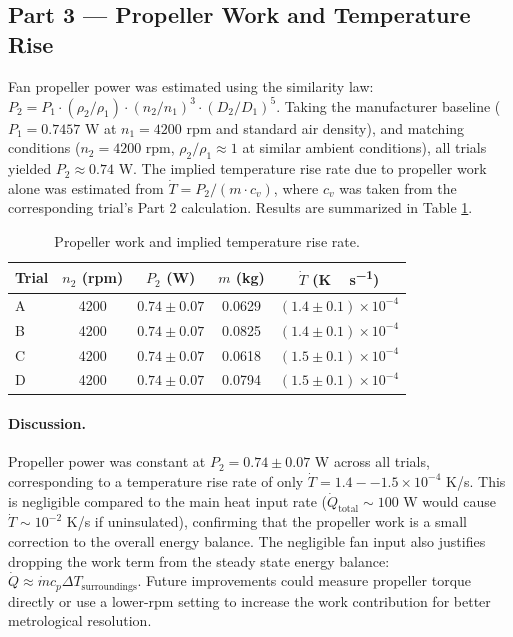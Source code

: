 \documentclass[12pt]{article}
\begin{document}
\subsection*{Part 3 — Propeller Work and Temperature Rise}

Fan propeller power was estimated using the similarity law: $P_2 = P_1 \cdot (\rho_2/\rho_1) \cdot (n_2/n_1)^3 \cdot (D_2/D_1)^5$. Taking the manufacturer baseline ($P_1 = 0.7457$ W at $n_1 = 4200$ rpm and standard air density), and matching conditions ($n_2 = 4200$ rpm, $\rho_2/\rho_1 \approx 1$ at similar ambient conditions), all trials yielded $P_2 \approx 0.74$ W. The implied temperature rise rate due to propeller work alone was estimated from $\dot{T} = P_2 / (m \cdot c_v)$, where $c_v$ was taken from the corresponding trial's Part 2 calculation. Results are summarized in Table \ref{tab:prop}.

\begin{table}[H]\centering
\begin{tabular}{@{}lcccc@{}}
\toprule
Trial & $n_2$ (rpm) & $P_2$ (W) & $m$ (kg) & $\dot T$ (\si{K\,s^{-1}}) \\
\midrule
A & 4200 & $0.74 \pm 0.07$ & 0.0629 & $(1.4 \pm 0.1) \times 10^{-4}$ \\
B & 4200 & $0.74 \pm 0.07$ & 0.0825 & $(1.4 \pm 0.1) \times 10^{-4}$ \\
C & 4200 & $0.74 \pm 0.07$ & 0.0618 & $(1.5 \pm 0.1) \times 10^{-4}$ \\
D & 4200 & $0.74 \pm 0.07$ & 0.0794 & $(1.5 \pm 0.1) \times 10^{-4}$ \\
\bottomrule
\end{tabular}
\caption{Propeller work and implied temperature rise rate.}
\label{tab:prop}
\end{table}

\paragraph{Discussion.} Propeller power was constant at $P_2 = 0.74 \pm 0.07$ W across all trials, corresponding to a temperature rise rate of only $\dot{T} = 1.4--1.5 \times 10^{-4}$ K/s. This is negligible compared to the main heat input rate ($\dot{Q}_{\text{total}} \sim 100$ W would cause $\dot{T} \sim 10^{-2}$ K/s if uninsulated), confirming that the propeller work is a small correction to the overall energy balance. The negligible fan input also justifies dropping the work term from the steady state energy balance: $\dot{Q} \approx \dot{m} c_p \Delta T_{\text{surroundings}}$. Future improvements could measure propeller torque directly or use a lower-rpm setting to increase the work contribution for better metrological resolution.
\end{document}
